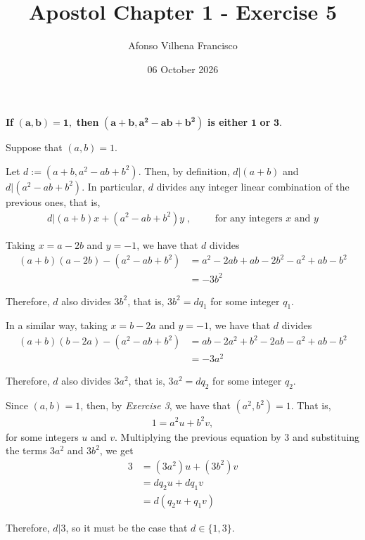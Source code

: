\documentclass{article}
\title{Apostol Chapter 1 - Exercise 5}
\author{Afonso Vilhena Francisco}
\date{06 October 2026}
\begin{document}
\maketitle

\textbf{If} $\mathbf{(a,b)=1},$ \textbf{then} $\mathbf{(a+b,a^2-ab+b^2)}$ \textbf{is either} $\mathbf{1}$ \textbf{or} $\mathbf{3}.$

\vspace{0.5cm}
Suppose that $(a,b)=1.$

Let $d := (a+b,a^2-ab+b^2) $. Then, by definition, $d|(a+b)$ and $d|(a^2-ab+b^2)$. In particular, $d$ divides any integer linear combination of the previous ones, that is, 
\begin{align*}
    d|(a+b)x+(a^2-ab+b^2)y\;, \hspace{1cm} \text{for any integers } x \text{ and } y
\end{align*}

Taking $x=a-2b$ and $y=-1$, we have that $d$ divides 
\begin{align*}
    (a+b)(a-2b)-(a^2-ab+b^2) & = a^2-2ab+ab-2b^2-a^2+ab-b^2\\
                                   & = -3b^2
\end{align*}

Therefore, $d$ also divides $3b^2$, that is, $3b^2=dq_1$ for some integer $q_1.$

In a similar way, taking $x=b-2a$ and $y=-1$, we have that $d$ divides
\begin{align*}
    (a+b)(b-2a)-(a^2-ab+b^2) &= ab-2a^2+b^2-2ab-a^2+ab-b^2 \\
                             &= -3a^2
\end{align*}   

Therefore, $d$ also divides $3a^2$,  that is, $3a^2=dq_2$ for some integer $q_2.$

Since $(a,b)=1$, then, by \textit{Exercise 3}, we have that $(a^2,b^2)=1$. That is, 
\begin{align*}
    1=a^2u+b^2v,
\end{align*}
for some integers $u$ and $v$. Multiplying the previous equation by 3 and substituing the terms $3a^2$ and $3b^2$, we get
\begin{align*}
    3 &= (3a^2)u+(3b^2)v\\
      &= dq_2u+dq_1v \\
      &= d(q_2u+q_1v)
\end{align*}

Therefore, $d|3$, so it must be the case that $d \in \{1,3\}$.
\end{document}
